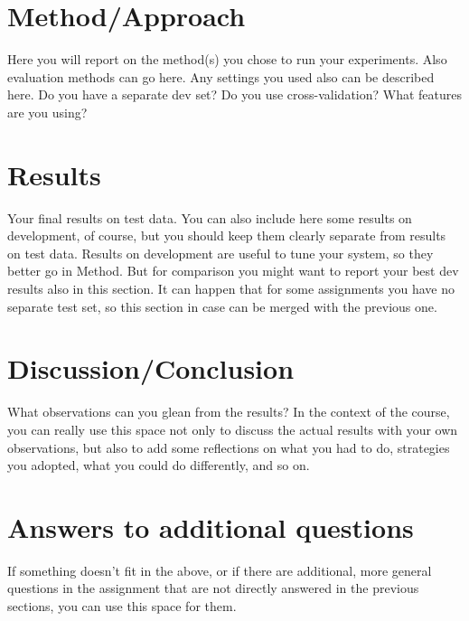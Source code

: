 \documentclass[11pt]{article}
\begin{document}
\section{Method/Approach}

Here you will report on the method(s) you chose to run your experiments. Also evaluation methods can go here. Any settings you used also can be described here. Do you have a separate dev set? Do you use cross-validation? What features are you using?

\section{Results}

Your final results on test data. You can also include here some results on development, of course, but you should keep them clearly separate from results on test data. Results on development are useful to tune your system, so they better go in Method. But for comparison you might want to report your best dev results also in this section. It can happen that for some assignments you have no separate test set, so this section in case can be merged with the previous one.

\section{Discussion/Conclusion}

What observations can you glean from the results? In the context of the course, you can really use this space not only to discuss the actual results with your own observations, but also to add some reflections on what you had to do, strategies you adopted, what you could do differently, and so on.

\section{Answers to additional questions}

If something doesn't fit in the above, or if there are additional, more general questions in the assignment that are not directly answered in the previous sections, you can use this space for them.


%
%
\end{document}
